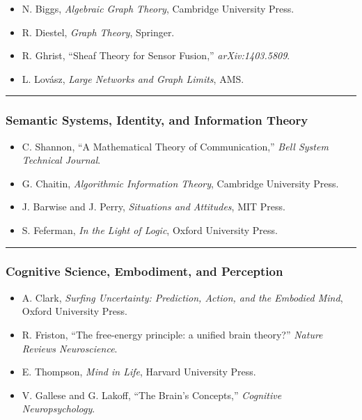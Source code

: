 \begin{itemize}
\tightlist
\item
  N. Biggs, \emph{Algebraic Graph Theory}, Cambridge University Press.
\item
  R. Diestel, \emph{Graph Theory}, Springer.
\item
  R. Ghrist, ``Sheaf Theory for Sensor Fusion,'' \emph{arXiv:1403.5809}.
\item
  L. Lovász, \emph{Large Networks and Graph Limits}, AMS.
\end{itemize}

\begin{center}\rule{0.5\linewidth}{0.5pt}\end{center}

\subsubsection{Semantic Systems, Identity, and Information Theory}\label{semantic-systems-identity-and-information-theory}

\begin{itemize}
\tightlist
\item
  C. Shannon, ``A Mathematical Theory of Communication,'' \emph{Bell System Technical Journal}.
\item
  G. Chaitin, \emph{Algorithmic Information Theory}, Cambridge University Press.
\item
  J. Barwise and J. Perry, \emph{Situations and Attitudes}, MIT Press.
\item
  S. Feferman, \emph{In the Light of Logic}, Oxford University Press.
\end{itemize}

\begin{center}\rule{0.5\linewidth}{0.5pt}\end{center}

\subsubsection{Cognitive Science, Embodiment, and Perception}\label{cognitive-science-embodiment-and-perception}

\begin{itemize}
\tightlist
\item
  A. Clark, \emph{Surfing Uncertainty: Prediction, Action, and the Embodied Mind}, Oxford University Press.
\item
  R. Friston, ``The free-energy principle: a unified brain theory?'' \emph{Nature Reviews Neuroscience}.
\item
  E. Thompson, \emph{Mind in Life}, Harvard University Press.
\item
  V. Gallese and G. Lakoff, ``The Brain's Concepts,'' \emph{Cognitive Neuropsychology}.
\end{itemize}

